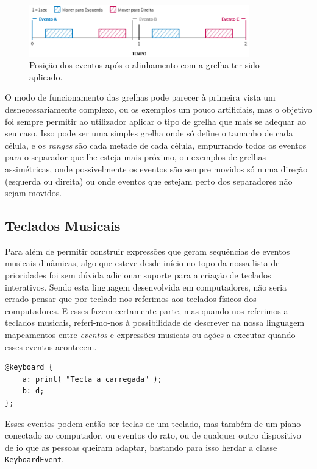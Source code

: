 \begin{figure}[h]
\begin{center}
    \includegraphics[width=0.85\textwidth]{img/grids_3_2.png}
\end{center}
\vspace*{-5mm}
\caption{Posição dos eventos após o alinhamento com a grelha ter sido aplicado.}
\label{fig:grids-3-2}
\end{figure}

O modo de funcionamento das grelhas pode parecer à primeira vista um desnecessariamente complexo, ou os exemplos um pouco artificiais, mas o objetivo foi sempre permitir ao utilizador aplicar o tipo de grelha que mais se adequar ao seu caso. Isso pode ser uma simples grelha onde só define o tamanho de cada célula, e os \textit{ranges} são cada metade de cada célula, empurrando todos os eventos para o separador que lhe esteja mais próximo, ou exemplos de grelhas assimétricas, onde possivelmente os eventos são sempre movidos só numa direção (esquerda ou direita) ou onde eventos que estejam perto dos separadores não sejam movidos.

\subsection{Teclados Musicais}
Para além de permitir construir expressões que geram sequências de eventos musicais dinâmicas, algo que esteve desde início no topo da nossa lista de prioridades foi sem dúvida adicionar suporte para a criação de teclados interativos. Sendo esta linguagem desenvolvida em computadores, não seria errado pensar que por teclado nos referimos aos teclados físicos dos computadores. E esses fazem certamente parte, mas quando nos referimos a teclados musicais, referi-mo-nos à possibilidade de descrever na nossa linguagem mapeamentos entre \textit{eventos} e expressões musicais ou ações a executar quando esses eventos acontecem.

\begin{lstlisting}[caption={Exemplo de declaração de duas teclas}]
@keyboard {
    a: print( "Tecla a carregada" );
    b: d;
};
\end{lstlisting}

Esses eventos podem então ser teclas de um teclado, mas também de um piano conectado ao computador, ou eventos do rato, ou de qualquer outro dispositivo de \acrshort{io} que as pessoas queiram adaptar, bastando para isso herdar a classe \texttt{KeyboardEvent}.

